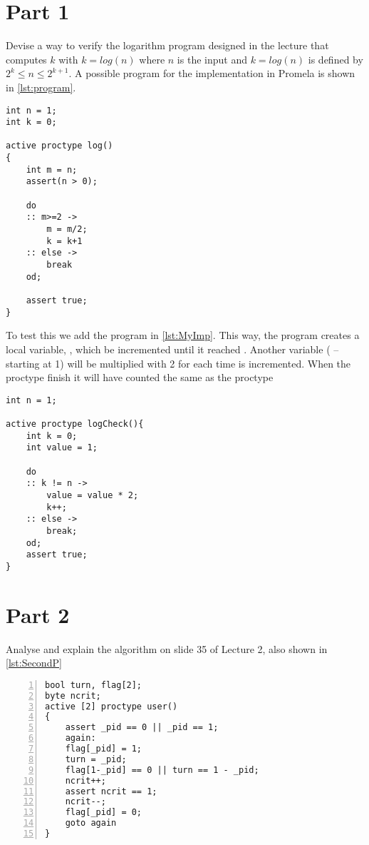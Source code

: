 \documentclass[Main]{subfiles}
\begin{document}
\section*{Part 1}

Devise a way to verify the logarithm program designed in the lecture that computes $k$ with $k = log(n)$ where $n$ is the input and $k = log(n)$ is defined by $2^k \leq n \leq 2^{k+1}$. 
A possible program for the implementation in Promela is shown in \codeTitle \ref{lst:program}.


\begin{lstlisting}[caption=Program in Prolog, style=Code-Prolog, label=lst:program]
int n = 1; 
int k = 0; 

active proctype log() 
{ 
	int m = n; 
	assert(n > 0);

	do
	:: m>=2 -> 
		m = m/2; 
		k = k+1
	:: else -> 
		break
	od;
	
	assert true;
}
\end{lstlisting}


To test this we add the program in \codeTitle \ref{lst:MyImp}.
This way, the program creates a local variable, , which be incremented until it reached .
Another variable ( -- starting at 1) will be multiplied with 2 for each time  is incremented.
When the proctype finish it will have counted the same as the proctype 


\begin{lstlisting}[caption=Test implementation, style=Code-Prolog, label=lst:MyImp]
int n = 1;

active proctype logCheck(){
	int k = 0;
	int value = 1;

	do 
	:: k != n -> 
		value = value * 2;
		k++;
	:: else ->
		break;
	od;
	assert true;
}
\end{lstlisting}



\section*{Part 2}
Analyse and explain the algorithm on slide 35 of Lecture 2, also shown in \codeTitle \ref{lst:SecondP}


\begin{lstlisting}[caption=Program to explain, style=Code-Prolog, numbers = left, label=lst:SecondP]
bool turn, flag[2]; 
byte ncrit; 
active [2] proctype user()  
{ 
	assert _pid == 0 || _pid == 1; 
	again:
	flag[_pid] = 1;
	turn = _pid;
	flag[1-_pid] == 0 || turn == 1 - _pid; 
	ncrit++;
	assert ncrit == 1;
	ncrit--;
	flag[_pid] = 0; 
	goto again 
} 
\end{lstlisting}
\end{document}
